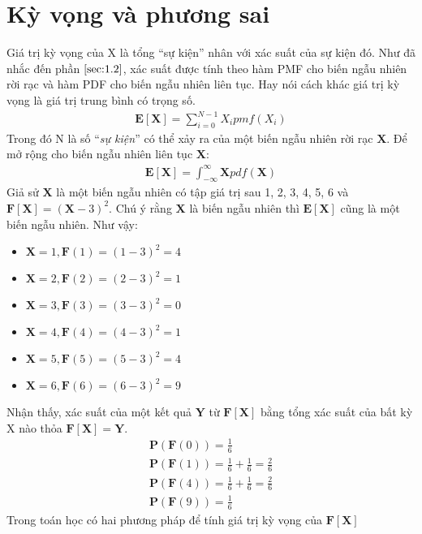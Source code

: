 \section{Kỳ vọng và phương sai}\label{sec:1.3}
Giá trị kỳ vọng của X là tổng “sự kiện” nhân với xác suất của sự kiện đó. Như đã nhắc đến phần $ \ref{sec:1.2} $, 
xác suất được tính theo hàm PMF cho biến ngẫu nhiên rời rạc và hàm PDF cho biến ngẫu nhiên liên tục. 
Hay nói cách khác giá trị kỳ vọng là giá trị trung bình có trọng số.
\begin{align}
	\textbf{E}[\textbf{X}]=\sum_{i=0}^{N-1}{X_ipmf(X_i)}
\end{align}
Trong đó N là số “\textit{sự kiện}” có thể xảy ra của một biến ngẫu nhiên rời rạc $\textbf{X}$. 
Để mở rộng cho biến ngẫu nhiên liên tục $\textbf{X}$: 
\begin{align}
	\textbf{E}[\textbf{X}]=\int_{-\infty}^{\infty}{\textbf{X}pdf(\textbf{X})}
\end{align}
Giả sử $\textbf{X}$ là một biến ngẫu nhiên có tập giá trị sau {1, 2, 3, 4, 5, 6} và $\textbf{F}[\textbf{X}]=(\textbf{X}-3)^2$. Chú ý rằng  $\textbf{X}$ là biến ngẫu nhiên thì $\textbf{E}[\textbf{X}]$ cũng là một biến ngẫu nhiên.
Như vậy:
\begin{itemize}
	\centering
	\item $\textbf{X}=1,\textbf{F}(1)=(1-3)^2=4$
	\item $\textbf{X}=2,\textbf{F}(2)=(2-3)^2=1$
	\item $\textbf{X}=3,\textbf{F}(3)=(3-3)^2=0$
	\item $\textbf{X}=4,\textbf{F}(4)=(4-3)^2=1$
	\item $\textbf{X}=5,\textbf{F}(5)=(5-3)^2=4$
	\item $\textbf{X}=6,\textbf{F}(6)=(6-3)^2=9$
\end{itemize}
Nhận thấy, xác suất của một kết quả $\textbf{Y}$ từ $\textbf{F}[\textbf{X}]$ bằng tổng xác suất của bất kỳ X nào thỏa $\textbf{F}[\textbf{X}]=\textbf{Y}$.
\begin{align*}
	\textbf{P}(\textbf{F}(0))=\frac{1}{6}\\
	\textbf{P}(\textbf{F}(1))=\frac{1}{6}+\frac{1}{6}=\frac{2}{6}\\
	\textbf{P}(\textbf{F}(4))=\frac{1}{6}+\frac{1}{6}=\frac{2}{6}\\
	\textbf{P}(\textbf{F}(9))=\frac{1}{6}
\end{align*}
Trong toán học có hai phương pháp để tính giá trị kỳ vọng của $\textbf{F}[\textbf{X}]$ 
